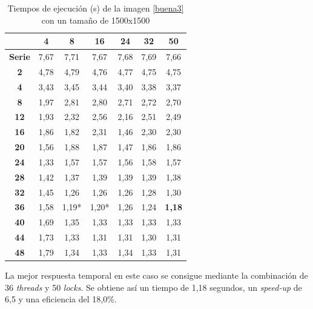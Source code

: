 \begin{table}[H]
	\centering
	\small
	\begin{tabular}{|c|c|c|c|c|c|c|}
		\hline
		{\bf \backslashbox{Threads}{Locks}}   & {\bf 4} & {\bf 8} & {\bf 16} & {\bf 24} & {\bf 32} & {\bf 50} \\ \hline
		{\bf Serie}  & 7,67    & 7,71    & 7,67     & 7,68     & 7,69     & 7,66     \\ \hline
		{\bf 2}  & 4,78    & 4,79    & 4,76     & 4,77     & 4,75     & 4,75     \\ \hline
		{\bf 4}  & 3,43    & 3,45    & 3,44     & 3,40     & 3,38     & 3,37     \\ \hline
		{\bf 8}  & 1,97    & 2,81    & 2,80     & 2,71     & 2,72     & 2,70     \\ \hline
		{\bf 12} & 1,93    & 2,32    & 2,56     & 2,16     & 2,51     & 2,49     \\ \hline
		{\bf 16} & 1,86    & 1,82    & 2,31     & 1,46     & 2,30     & 2,30     \\ \hline
		{\bf 20} & 1,56    & 1,88    & 1,87     & 1,47     & 1,86     & 1,86     \\ \hline
		{\bf 24} & 1,33    & 1,57    & 1,57     & 1,56     & 1,58     & 1,57     \\ \hline
		{\bf 28} & 1,42    & 1,37    & 1,39     & 1,39     & 1,39     & 1,38     \\ \hline
		{\bf 32} & 1,45    & 1,26    & 1,26     & 1,26     & 1,28     & 1,30     \\ \hline
		{\bf 36} & 1,58    & 1,19*    & 1,20*     & 1,26     & 1,24     & \textbf{1,18}     \\ \hline
		{\bf 40} & 1,69    & 1,35    & 1,33     & 1,33     & 1,33     & 1,33     \\ \hline
		{\bf 44} & 1,73    & 1,33    & 1,31     & 1,31     & 1,30     & 1,31     \\ \hline
		{\bf 48} & 1,79    & 1,34    & 1,33     & 1,34     & 1,33     & 1,31     \\ \hline
	\end{tabular}
	\captionsetup{justification=centering}	
	\caption{Tiempos de ejecuci\'{o}n (s) de la imagen \ref{buena3} con un tama\~{n}o de 1500x1500}
	\label{img3-1500}
\end{table}

La mejor respuesta temporal en este caso se consigue mediante la combinaci\'{o}n de 36 \textit{threads} y 50 \textit{locks}. Se obtiene as\'{i} un tiempo de 1,18 segundos, un \textit{speed-up} de 6,5 y una eficiencia del 18,0\%.


